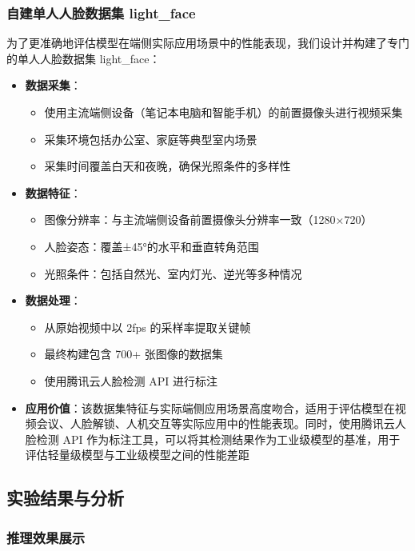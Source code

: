 \documentclass{article}
\begin{document}
\subsubsection{自建单人人脸数据集 light\_face}
为了更准确地评估模型在端侧实际应用场景中的性能表现，我们设计并构建了专门的单人人脸数据集 light\_face：
\begin{itemize}
    \item \textbf{数据采集}：
    \begin{itemize}
        \item 使用主流端侧设备（笔记本电脑和智能手机）的前置摄像头进行视频采集
        \item 采集环境包括办公室、家庭等典型室内场景
        \item 采集时间覆盖白天和夜晚，确保光照条件的多样性
    \end{itemize}
    \item \textbf{数据特征}：
    \begin{itemize}
        \item 图像分辨率：与主流端侧设备前置摄像头分辨率一致（1280×720）
        \item 人脸姿态：覆盖±45°的水平和垂直转角范围
        \item 光照条件：包括自然光、室内灯光、逆光等多种情况
    \end{itemize}
    \item \textbf{数据处理}：
    \begin{itemize}
        \item 从原始视频中以 2fps 的采样率提取关键帧
        \item 最终构建包含 700+ 张图像的数据集
        \item 使用腾讯云人脸检测 API 进行标注
    \end{itemize}
    \item \textbf{应用价值}：该数据集特征与实际端侧应用场景高度吻合，适用于评估模型在视频会议、人脸解锁、人机交互等实际应用中的性能表现。同时，使用腾讯云人脸检测 API 作为标注工具，可以将其检测结果作为工业级模型的基准，用于评估轻量级模型与工业级模型之间的性能差距
\end{itemize}

\subsection{实验结果与分析}
\subsubsection{推理效果展示}
\end{document}
